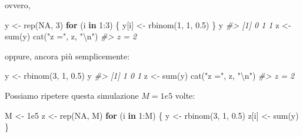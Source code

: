\documentclass[
  11pt,
]{krantz}
\makeatletter
\newenvironment{Shaded}{\begin{snugshade}}{\end{snugshade}}
\newcommand{\CommentTok}[1]{\textcolor[rgb]{0.37,0.37,0.37}{\textit{#1}}}
\newcommand{\ConstantTok}[1]{\textcolor[rgb]{0,0,0}{#1}}
\newcommand{\ControlFlowTok}[1]{\textcolor[rgb]{0.27,0.27,0.27}{\textbf{#1}}}
\newcommand{\DecValTok}[1]{\textcolor[rgb]{0.06,0.06,0.06}{#1}}
\newcommand{\FloatTok}[1]{\textcolor[rgb]{0.06,0.06,0.06}{#1}}
\newcommand{\FunctionTok}[1]{\textcolor[rgb]{0,0,0}{#1}}
\newcommand{\NormalTok}[1]{#1}
\newcommand{\OtherTok}[1]{\textcolor[rgb]{0.37,0.37,0.37}{#1}}
\newcommand{\SpecialCharTok}[1]{\textcolor[rgb]{0,0,0}{#1}}
\newcommand{\StringTok}[1]{\textcolor[rgb]{0.5,0.5,0.5}{#1}}
\newenvironment{kframe}{%
\medskip{}
\setlength{\fboxsep}{.8em}
 \def\at@end@of@kframe{}%
 \ifinner\ifhmode%
  \def\at@end@of@kframe{\end{minipage}}%
  \begin{minipage}{\columnwidth}%
 \fi\fi%
 \def\FrameCommand##1{\hskip\@totalleftmargin \hskip-\fboxsep
 \colorbox{shadecolor}{##1}\hskip-\fboxsep
     \hskip-\linewidth \hskip-\@totalleftmargin \hskip\columnwidth}%
 \MakeFramed {\advance\hsize-\width
   \@totalleftmargin\z@ \linewidth\hsize
   \@setminipage}}%
 {\par\unskip\endMakeFramed%
 \at@end@of@kframe}
\renewenvironment{Shaded}{\begin{kframe}}{\end{kframe}}
\theoremstyle{definition}
\theoremstyle{definition}
\theoremstyle{definition}
\theoremstyle{definition}
\theoremstyle{remark}
\makeatother
\begin{document}
ovvero,

\begin{Shaded}
\begin{Highlighting}[]
\NormalTok{y }\OtherTok{\textless{}{-}} \FunctionTok{rep}\NormalTok{(}\ConstantTok{NA}\NormalTok{, }\DecValTok{3}\NormalTok{)}
\ControlFlowTok{for}\NormalTok{ (i }\ControlFlowTok{in} \DecValTok{1}\SpecialCharTok{:}\DecValTok{3}\NormalTok{) \{}
\NormalTok{  y[i] }\OtherTok{\textless{}{-}} \FunctionTok{rbinom}\NormalTok{(}\DecValTok{1}\NormalTok{, }\DecValTok{1}\NormalTok{, }\FloatTok{0.5}\NormalTok{)}
\NormalTok{\}}
\NormalTok{y}
\CommentTok{\#\textgreater{} [1] 0 1 1}
\NormalTok{z }\OtherTok{\textless{}{-}} \FunctionTok{sum}\NormalTok{(y)}
\FunctionTok{cat}\NormalTok{(}\StringTok{"z ="}\NormalTok{, z, }\StringTok{"}\SpecialCharTok{\textbackslash{}n}\StringTok{"}\NormalTok{)}
\CommentTok{\#\textgreater{} z = 2}
\end{Highlighting}
\end{Shaded}

oppure, ancora più semplicemente:

\begin{Shaded}
\begin{Highlighting}[]
\NormalTok{y }\OtherTok{\textless{}{-}} \FunctionTok{rbinom}\NormalTok{(}\DecValTok{3}\NormalTok{, }\DecValTok{1}\NormalTok{, }\FloatTok{0.5}\NormalTok{)}
\NormalTok{y}
\CommentTok{\#\textgreater{} [1] 1 0 1}
\NormalTok{z }\OtherTok{\textless{}{-}} \FunctionTok{sum}\NormalTok{(y)}
\FunctionTok{cat}\NormalTok{(}\StringTok{"z ="}\NormalTok{, z, }\StringTok{"}\SpecialCharTok{\textbackslash{}n}\StringTok{"}\NormalTok{)}
\CommentTok{\#\textgreater{} z = 2}
\end{Highlighting}
\end{Shaded}

Possiamo ripetere questa simulazione \(M = 1e5\) volte:

\begin{Shaded}
\begin{Highlighting}[]
\NormalTok{M }\OtherTok{\textless{}{-}} \FloatTok{1e5}
\NormalTok{z }\OtherTok{\textless{}{-}} \FunctionTok{rep}\NormalTok{(}\ConstantTok{NA}\NormalTok{, M)}
\ControlFlowTok{for}\NormalTok{ (i }\ControlFlowTok{in} \DecValTok{1}\SpecialCharTok{:}\NormalTok{M) \{}
\NormalTok{  y }\OtherTok{\textless{}{-}} \FunctionTok{rbinom}\NormalTok{(}\DecValTok{3}\NormalTok{, }\DecValTok{1}\NormalTok{, }\FloatTok{0.5}\NormalTok{)}
\NormalTok{  z[i] }\OtherTok{\textless{}{-}} \FunctionTok{sum}\NormalTok{(y)}
\NormalTok{\}}
\end{Highlighting}
\end{Shaded}
\end{document}

